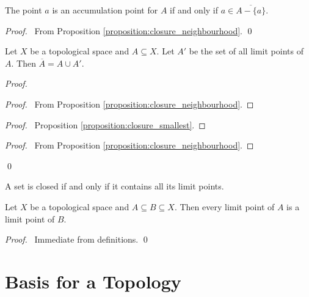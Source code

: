 \begin{lemma}
    The point $a$ is an accumulation point for $A$ if and only if $a \in \overline{A - \{a\}}$.
\end{lemma}

\begin{proof}
    \pf\ From Proposition \ref{proposition:closure_neighbourhood}. \qed
\end{proof}

\begin{theorem}
    \label{theorem:limit_point_closure}
    Let $X$ be a topological space and $A \subseteq X$. Let $A'$ be the set of all limit points of $A$.
    Then $\overline{A} = A \cup A'$.
\end{theorem}

\begin{proof}
    \pf
    \begin{proof}
        \pf\ From Proposition \ref{proposition:closure_neighbourhood}.
    \end{proof}
    \begin{proof}
        \pf\ Proposition \ref{proposition:closure_smallest}.
    \end{proof}
    \begin{proof}
        \pf\ From Proposition \ref{proposition:closure_neighbourhood}.
    \end{proof}
    \qed
\end{proof}

\begin{corollary}
    \label{corollary:closed_limit_point}
    A set is closed if and only if it contains all its limit points.
\end{corollary}

\begin{lemma}
    \label{lemma:limit_point_subset}
    Let $X$ be a topological space and $A \subseteq B \subseteq X$. Then every limit
    point of $A$ is a limit point of $B$.
\end{lemma}

\begin{proof}
    \pf\ Immediate from definitions. \qed
\end{proof}

\section{Basis for a Topology}

